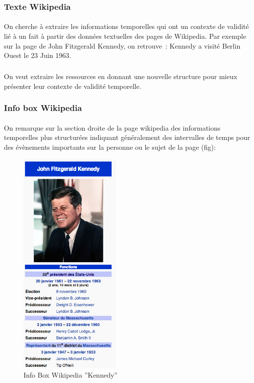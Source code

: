 \subsubsection*{Texte Wikipedia}
\paragraph{}
On cherche à extraire les informations temporelles qui ont un contexte de validité lié à un fait à partir des données textuelles des pages de Wikipedia. 
Par exemple sur la page de John Fitzgerald Kennedy, on retrouve~:
\newline
Kennedy a visité Berlin Ouest le 23 Juin 1963.
\subparagraph{}
On veut extraire les ressources en donnant une nouvelle structure pour mieux présenter leur contexte de validité temporelle.
\subsubsection*{Info box Wikipedia}
\paragraph{}
On remarque sur la section droite de la page wikipedia des informations temporelles plus structurées indiquant généralement des intervalles de temps pour des évènements importants sur la personne ou le sujet de la page (fig):
\begin{figure}[H]
        \centering
                \centering
                \includegraphics[width=5cm]{kennedy.png}
               \caption{Info Box Wikipedia ''Kennedy''}

\end{figure}
